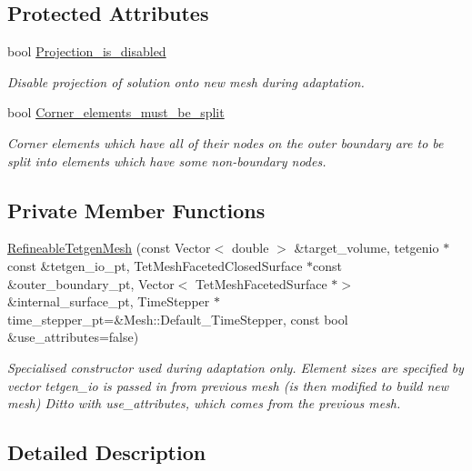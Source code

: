 \subsection*{Protected Attributes}
\begin{DoxyCompactItemize}
\item 
bool \hyperlink{classoomph_1_1RefineableTetgenMesh_a274ebedf983f3b34620fa2bbb1980fcd}{Projection\+\_\+is\+\_\+disabled}
\begin{DoxyCompactList}\small\item\em Disable projection of solution onto new mesh during adaptation. \end{DoxyCompactList}\item 
bool \hyperlink{classoomph_1_1RefineableTetgenMesh_a72b505d4bfd018471ef1543e18ae5fce}{Corner\+\_\+elements\+\_\+must\+\_\+be\+\_\+split}
\begin{DoxyCompactList}\small\item\em Corner elements which have all of their nodes on the outer boundary are to be split into elements which have some non-\/boundary nodes. \end{DoxyCompactList}\end{DoxyCompactItemize}
\subsection*{Private Member Functions}
\begin{DoxyCompactItemize}
\item 
\hyperlink{classoomph_1_1RefineableTetgenMesh_ab1c379c483f5f2a025a68683fbada666}{Refineable\+Tetgen\+Mesh} (const Vector$<$ double $>$ \&target\+\_\+volume, tetgenio $\ast$const \&tetgen\+\_\+io\+\_\+pt, Tet\+Mesh\+Faceted\+Closed\+Surface $\ast$const \&outer\+\_\+boundary\+\_\+pt, Vector$<$ Tet\+Mesh\+Faceted\+Surface $\ast$$>$ \&internal\+\_\+surface\+\_\+pt, Time\+Stepper $\ast$time\+\_\+stepper\+\_\+pt=\&Mesh\+::\+Default\+\_\+\+Time\+Stepper, const bool \&use\+\_\+attributes=false)
\begin{DoxyCompactList}\small\item\em Specialised constructor used during adaptation only. Element sizes are specified by vector tetgen\+\_\+io is passed in from previous mesh (is then modified to build new mesh) Ditto with use\+\_\+attributes, which comes from the previous mesh. \end{DoxyCompactList}\end{DoxyCompactItemize}


\subsection{Detailed Description}
